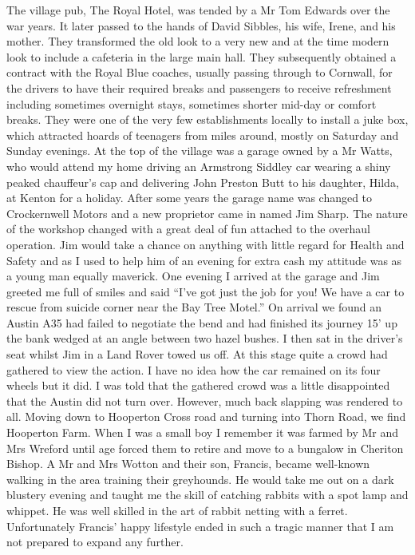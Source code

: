 The village pub, The Royal Hotel, was tended by a Mr Tom Edwards over the war
years. It later passed to the hands of David Sibbles, his wife, Irene, and his
mother. They transformed the old look to a very new and at the time modern look
to include a cafeteria in the large main hall. They subsequently obtained a
contract with the Royal Blue coaches, usually passing through to Cornwall, for
the drivers to have their required breaks and passengers to receive refreshment
including sometimes overnight stays, sometimes shorter mid-day or comfort
breaks. They were one of the very few establishments locally to install a juke
box, which attracted hoards of teenagers from miles around, mostly on Saturday
and Sunday evenings. At the top of the village was a garage owned by a Mr
Watts, who would attend my home driving an Armstrong Siddley car wearing a
shiny peaked chauffeur's cap and delivering John Preston Butt to his daughter,
Hilda, at Kenton for a holiday. After some years the garage name was changed to
Crockernwell Motors and a new proprietor came in named Jim Sharp. The nature of
the workshop changed with a great deal of fun attached to the overhaul
operation. Jim would take a chance on anything with little regard for Health
and Safety and as I used to help him of an evening for extra cash my attitude
was as a young man equally maverick. One evening I arrived at the garage and
Jim greeted me full of smiles and said ``I've got just the job for you!  We
have a car to rescue from suicide corner near the Bay Tree Motel.''  On arrival
we found an Austin A35 had failed to negotiate the bend and had finished its
journey 15' up the bank wedged at an angle between two hazel bushes. I then sat
in the driver's seat whilst Jim in a Land Rover towed us off. At this stage
quite a crowd had gathered to view the action. I have no idea how the car
remained on its four wheels but it did. I was told that the gathered crowd was
a little disappointed that the Austin did not turn over. However, much back
slapping was rendered to all. Moving down to Hooperton Cross road and turning
into Thorn Road, we find Hooperton Farm. When I was a small boy I remember it
was farmed by Mr and Mrs Wreford until age forced them to retire and move to a
bungalow in Cheriton Bishop. A Mr and Mrs Wotton and their son, Francis, became
well-known walking in the area training their greyhounds. He would take me out
on a dark blustery evening and taught me the skill of catching rabbits with a
spot lamp and whippet. He was well skilled in the art of rabbit netting with a
ferret. Unfortunately Francis' happy lifestyle ended in such a tragic manner
that I am not prepared to expand any further.

